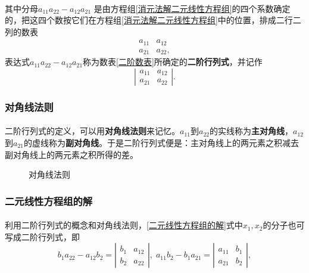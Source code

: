 \paragraph{}
其中分母$a_{11}a_{22} - a_{12}a_{21}$ 是由方程组\eqref{消元法解二元线性方程组}的四个系数确定的，把这四个数按它们在方程组\eqref{消元法解二元线性方程组}中的位置，排成二行二列的数表
\begin{equation}
\label{二阶数表}
\begin{array}{ll}
a_{11} & a_{12} \\ a_{21} & a_{22},
\end{array}
\end{equation}
表达式$a_{11}a_{22} - a_{12}a_{21}$称为数表\eqref{二阶数表}所确定的\textbf{二阶行列式}，并记作
\begin{equation}
  \left|
  \begin{array}{ll}
  a_{11} & a_{12} \\ a_{21} & a_{22}
  \end{array} \right|.
\end{equation}

\subsubsection{对角线法则}
\paragraph{}
二阶行列式的定义，可以用\textbf{对角线法则}来记忆。$a_{11}$到$a_{22}$的实线称为\textbf{主对角线}，$a_{12}$到$a_{21}$的虚线称为\textbf{副对角线}。于是二阶行列式便是：主对角线上的两元素之积减去副对角线上的两元素之积所得的差。
\begin{figure}[H]
\centering
  
  \caption{对角线法则}
  \label{图:二阶对角线法则}
\end{figure}

\subsubsection{二元线性方程组的解}
\paragraph{}
利用二阶行列式的概念和对角线法则，\eqref{二元线性方程组的解}式中$x_1,x_2$的分子也可写成二阶行列式，即
\begin{equation*}
  b_1a_{22} - a_{12}b_2 = \left|\begin{array}{ll} b_1 & a_{12} \\ b_2 & a_{22}\end{array}\right|, \;
  a_{11}b_2 - b_1a_{21} = \left|\begin{array}{ll} a_{11} & b_1 \\ a_{21} & b_2\end{array}\right|,
\end{equation*}

